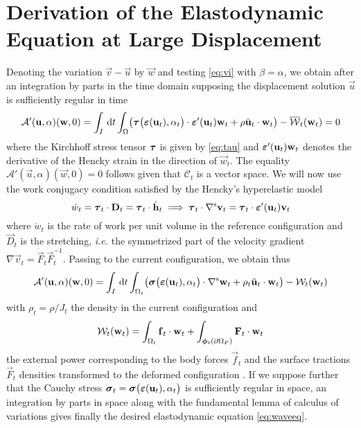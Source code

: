 \section{Derivation of the Elastodynamic Equation at Large Displacement} \label{sec:elastodyna}
Denoting the variation $\vec{v}-\vec{u}$ by $\vec{w}$ and testing \eqref{eq:vi} with $\beta=\alpha$, we obtain after an integration by parts in the time domain supposing the displacement solution $\vec{u}$ is sufficiently regular in time
\[
\mathcal{A}'(\vec{u},\alpha)(\vec{w},0)=\int_I\D{t}\int_\Omega\bigl(\vtau\bigl(\eps(\vec{u}_t),\alpha_t\bigr)\cdot\eps'(\vec{u}_t)\vec{w}_t+\rho\ddot{\vec{u}}_t\cdot\vec{w}_t\bigr)-\overline{\mathcal{W}}_t(\vec{w}_t)=0
\]
where the Kirchhoff stress tensor $\vtau$ is given by \eqref{eq:tau} and $\eps'(\vec{u}_t)\vec{w}_t$ denotes the derivative of the Hencky strain in the direction of $\vec{w}_t$. The equality $\mathcal{A}'(\vec{u},\alpha)(\vec{w},0)=0$ follows given that $\mathcal{C}_t$ is a vector space. We will now use the work conjugacy condition satisfied by the Hencky's hyperelastic model \cite{XiaoChen:2002}
\begin{equation} \label{eq:workconjugacy}
\dot{w}_t=\vtau_t\cdot\vec{D}_t=\vtau_t\cdot\dot{\vec{h}}_t\implies\vtau_t\cdot\symgrad\vec{v}_t=\vtau_t\cdot\eps'(\vec{u}_t)\vec{v}_t
\end{equation}
where $\dot{w}_t$ is the rate of work per unit volume in the reference configuration and $\vec{D}_t$ is the stretching, \emph{i.e.} the symmetrized part of the velocity gradient $\nabla\vec{v}_t=\dot{\vec{F}}_t\vec{F}_t^{-1}$. Passing to the current configuration, we obtain thus
\[
\mathcal{A}'(\vec{u},\alpha)(\vec{w},0)=\int_I\D{t}\int_{\Omega_t}\bigl(\sig\bigl(\eps(\vec{u}_t),\alpha_t\bigr)\cdot\symgrad\vec{w}_t+\rho_t\ddot{\vec{u}}_t\cdot\vec{w}_t\bigr)-\mathcal{W}_t(\vec{w}_t)
\]
with $\rho_t=\rho/J_t$ the density in the current configuration and
\[
\mathcal{W}_t(\vec{w}_t)=\int_{\Omega_t}\vec{f}_t\cdot\vec{w}_t+\int_{\vphi_t(\partial\Omega_F)}\vec{F}_t\cdot\vec{w}_t
\]
the external power corresponding to the body forces $\vec{f}_t$ and the surface tractions $\vec{F}_t$ densities transformed to the deformed configuration \cite{Ciarlet:1993aa}. If we suppose further that the Cauchy stress $\sig_t=\sig\bigl(\eps(\vec{u}_t),\alpha_t\bigr)$ is sufficiently regular in space, an integration by parts in space along with the fundamental lemma of calculus of variations gives finally the desired elastodynamic equation \eqref{eq:waveeq}.